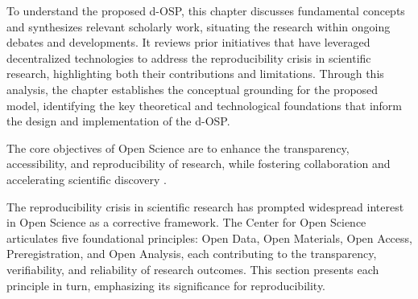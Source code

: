\documentclass[final]{rc-book-2.14}
\begin{document}
To understand the proposed d-OSP, this chapter discusses fundamental concepts and synthesizes relevant scholarly work, situating the research within ongoing debates and developments. It reviews prior initiatives that have leveraged decentralized technologies to address the reproducibility crisis in scientific research, highlighting both their contributions and limitations. Through this analysis, the chapter establishes the conceptual grounding for the proposed model, identifying the key theoretical and technological foundations that inform the design and implementation of the d-OSP.

The core objectives of Open Science are to enhance the transparency, accessibility, and reproducibility of research, while fostering collaboration and accelerating scientific discovery \cite{Leonelli2016}. 

The reproducibility crisis in scientific research has prompted widespread interest in Open Science as a corrective framework. The Center for Open Science articulates five foundational principles: Open Data, Open Materials, Open Access, Preregistration, and Open Analysis, each contributing to the transparency, verifiability, and reliability of research outcomes. This section presents each principle in turn, emphasizing its significance for reproducibility.
\end{document}
